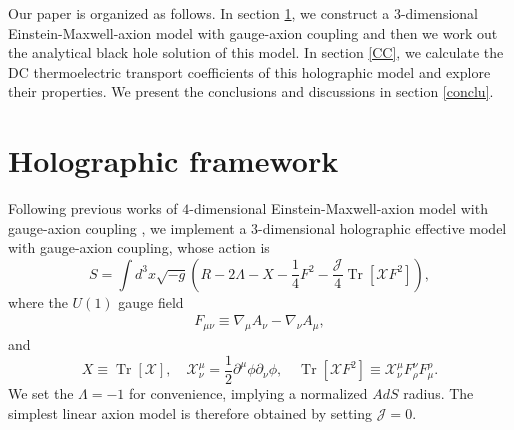 \documentclass[preprint,onecolumn,nofootinbib]{revtex4}
\newcommand{\fa}{\begin{eqnarray}}
\newcommand{\ffa}{\end{eqnarray}}
\begin{document}
Our paper is organized as follows. In section \ref{sec-EM-bh}, we construct a $3$-dimensional Einstein-Maxwell-axion model with gauge-axion coupling and then we work out the analytical black hole solution of this model. In section \ref{CC}, we calculate the DC thermoelectric transport coefficients of this holographic model and explore their properties. 
We present the conclusions and discussions in section \ref{conclu}.

\section{Holographic framework}\label{sec-EM-bh}

Following previous works of $4$-dimensional Einstein-Maxwell-axion model with gauge-axion coupling \cite{Gouteraux:2016wxj,Baggioli:2016pia,Li:2018vrz,Liu:2022bam,Zhong:2022mok}, we implement a $3$-dimensional holographic effective model with gauge-axion coupling, whose action is 
\begin{equation}
	S=\int d^{3} x \sqrt{-g}\left(R-2 \Lambda- X-\frac{1}{4} F^{2}-\frac{\mathcal{J}}{4} \operatorname{Tr}\left[\mathcal{X} F^{2}\right]\right),
\end{equation}
where the $ U(1) $ gauge field  
\fa
F_{\mu \nu} \equiv \nabla_{\mu} A_{\nu}-\nabla_{\nu} A_{\mu} ,
\ffa
and
\begin{equation}
	 X \equiv \operatorname{Tr}[\mathcal{X}], \quad  \mathcal{X}_{\nu}^{\mu}=\frac{1}{2}  \partial^{\mu} \phi \partial_{\nu} \phi, \quad  \operatorname{Tr}\left[\mathcal{X} F^{2}\right] \equiv \mathcal{X}_{\nu}^{\mu} F_{\rho}^{\nu} F_{\mu}^{\rho}.
\end{equation}
We set the $ \Lambda = -1 $ for convenience, implying a normalized $ AdS $ radius. The simplest linear axion model is therefore obtained by setting $ \mathcal{J}  = 0$.
\end{document}
